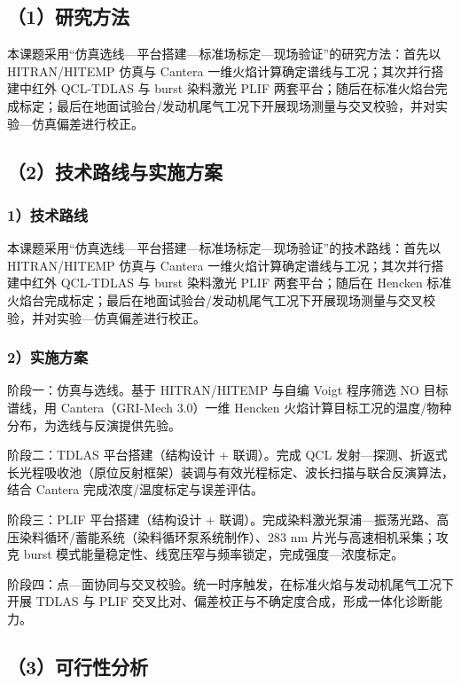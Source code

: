 \subsection{（1）研究方法}

本课题采用``仿真选线—平台搭建—标准场标定—现场验证''的研究方法：首先以 HITRAN/HITEMP 仿真与 Cantera 一维火焰计算确定谱线与工况；其次并行搭建中红外 QCL-TDLAS 与 burst 染料激光 PLIF 两套平台；随后在标准火焰台完成标定；最后在地面试验台/发动机尾气工况下开展现场测量与交叉校验，并对实验—仿真偏差进行校正。

\subsection{（2）技术路线与实施方案}

\subsubsection{1）技术路线}

本课题采用``仿真选线—平台搭建—标准场标定—现场验证''的技术路线：首先以 HITRAN/HITEMP 仿真与 Cantera 一维火焰计算确定谱线与工况；其次并行搭建中红外 QCL-TDLAS 与 burst 染料激光 PLIF 两套平台；随后在 Hencken 标准火焰台完成标定；最后在地面试验台/发动机尾气工况下开展现场测量与交叉校验，并对实验—仿真偏差进行校正。

\subsubsection{2）实施方案}

阶段一：仿真与选线。基于 HITRAN/HITEMP 与自编 Voigt 程序筛选 NO 目标谱线，用 Cantera（GRI-Mech 3.0）一维 Hencken 火焰计算目标工况的温度/物种分布，为选线与反演提供先验。

阶段二：TDLAS 平台搭建（结构设计 + 联调）。完成 QCL 发射—探测、折返式长光程吸收池（原位反射框架）装调与有效光程标定、波长扫描与联合反演算法，结合 Cantera 完成浓度/温度标定与误差评估。

阶段三：PLIF 平台搭建（结构设计 + 联调）。完成染料激光泵浦—振荡光路、高压染料循环/蓄能系统（染料循环泵系统制作）、283 nm 片光与高速相机采集；攻克 burst 模式能量稳定性、线宽压窄与频率锁定，完成强度—浓度标定。

阶段四：点—面协同与交叉校验。统一时序触发，在标准火焰与发动机尾气工况下开展 TDLAS 与 PLIF 交叉比对、偏差校正与不确定度合成，形成一体化诊断能力。

\subsection{（3）可行性分析}

